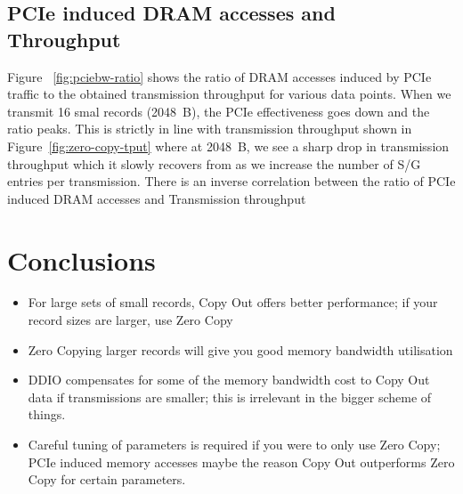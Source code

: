 \subsection{PCIe induced DRAM accesses and Throughput}
Figure ~\ref{fig:pciebw-ratio} shows the ratio of DRAM accesses induced by PCIe traffic to the obtained transmission throughput for various data points. When we transmit 16 smal records (2048~B),
the PCIe effectiveness goes down and the ratio peaks. This is strictly in line with transmission throughput shown in Figure~\ref{fig:zero-copy-tput} where at 2048~B, we see a sharp drop in transmission 
throughput which it slowly recovers from as we increase the number of S/G entries per transmission. There is an inverse correlation between the ratio of PCIe induced DRAM accesses and Transmission throughput




\section{Conclusions}
\begin{itemize}
\item For large sets of small records, Copy Out offers better performance; if your record sizes are larger, use Zero Copy
\item Zero Copying larger records will give you good memory bandwidth utilisation
\item DDIO compensates for some of the memory bandwidth cost to Copy Out data if transmissions are smaller; this is irrelevant in the bigger scheme of things.
\item Careful tuning of parameters is required if you were to only use Zero Copy; PCIe induced memory accesses maybe the reason Copy Out outperforms Zero Copy for certain parameters. 
\end{itemize}


